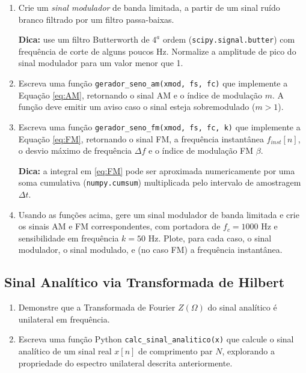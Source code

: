 \documentclass[a4paper,twoside,12pt]{article}
\begin{document}
	\begin{enumerate}

		\item Crie um \emph{sinal modulador} de banda limitada, a partir de um sinal ruído branco filtrado por um filtro passa-baixas.
		
		\textbf{Dica:} use um filtro Butterworth de $4^a$ ordem (\texttt{scipy.signal.butter}) com frequência de corte de alguns poucos Hz. Normalize a amplitude de pico do sinal modulador para um valor menor que 1.
		
		\item Escreva uma função \texttt{gerador\_seno\_am(xmod, fs, fc)} que implemente a Equação \eqref{eq:AM}, retornando o sinal AM e o índice de modulação $m$. A função deve emitir um aviso caso o sinal esteja sobremodulado ($m>1$).
		
		\item Escreva uma função \texttt{gerador\_seno\_fm(xmod, fs, fc, k)} que implemente a Equação \eqref{eq:FM}, retornando o sinal FM, a frequência instantânea $f_{inst}[n]$, o desvio máximo de frequência $\Delta f$ e o índice de modulação FM $\beta$.
		
		\textbf{Dica:} a integral em \eqref{eq:FM} pode ser aproximada numericamente por uma soma cumulativa (\texttt{numpy.cumsum}) multiplicada pelo intervalo de amostragem $\Delta t$.
		
		\item Usando as funções acima, gere um sinal modulador de banda limitada e crie os sinais AM e FM correspondentes, com portadora de $f_c = 1000$ Hz e sensibilidade em frequência $k=50$ Hz. Plote, para cada caso, o sinal modulador, o sinal modulado, e (no caso FM) a frequência instantânea.
		
	\end{enumerate}
	
	
	\subsection{Sinal Analítico via Transformada de Hilbert}
	\label{sec:tarefas2}
	
	\begin{enumerate}
		\item Demonstre que a Transformada de Fourier $Z(\Omega)$ do sinal analítico é unilateral em frequência.
		
		\item Escreva uma função Python \texttt{calc\_sinal\_analitico(x)} que calcule o sinal analítico de um sinal real $x[n]$ de comprimento par $N$, explorando a propriedade do espectro unilateral descrita anteriormente.
		
	\end{enumerate}
	
\end{document}
